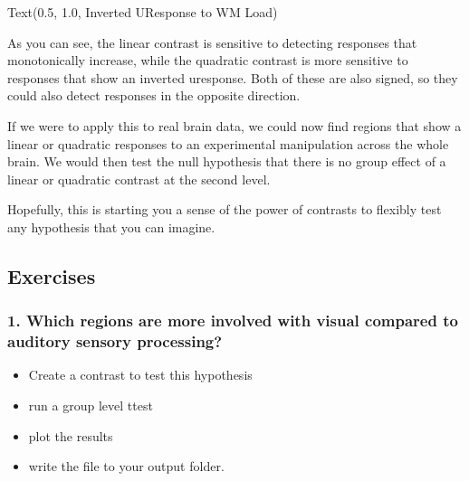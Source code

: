 \documentclass[letterpaper,10pt,english]{sphinxmanual}
\begin{document}
\begin{sphinxVerbatim}[commandchars=\\\{\}]
Text(0.5, 1.0, \PYGZsq{}Inverted U\PYGZhy{}Response to WM Load\PYGZsq{})
\end{sphinxVerbatim}

\noindent{}

As you can see, the linear contrast is sensitive to detecting responses that monotonically increase, while the quadratic contrast is more sensitive to responses that show an inverted u\sphinxhyphen{}response. Both of these are also signed, so they could also detect responses in the opposite direction.

If we were to apply this to real brain data, we could now find regions that show a linear or quadratic responses to an experimental manipulation across the whole brain. We would then test the null hypothesis that there is no group effect of a linear or quadratic contrast at the second level.

Hopefully, this is starting you a sense of the power of contrasts to flexibly test any hypothesis that you can imagine.


\subsection{Exercises}
\label{\detokenize{content/Group_Analysis:exercises}}

\subsubsection{1. Which regions are more involved with visual compared to auditory sensory processing?}
\label{\detokenize{content/Group_Analysis:which-regions-are-more-involved-with-visual-compared-to-auditory-sensory-processing}}\begin{itemize}
\item {} 
Create a contrast to test this hypothesis

\item {} 
run a group level t\sphinxhyphen{}test

\item {} 
plot the results

\item {} 
write the file to your output folder.

\end{itemize}
\end{document}
